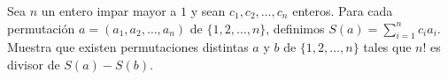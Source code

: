 Sea $n$ un entero impar mayor a $1$ y sean $c_1, c_2, \ldots, c_n$ enteros. Para cada permutación $a = (a_1, a_2, \ldots, a_n)$ de $\{1,2,\ldots,n\}$, definimos $S(a) = \sum_{i=1}^n c_i a_i$. Muestra que existen permutaciones distintas $a$ y $b$ de $\{1,2,\ldots,n\}$ tales que $n!$ es divisor de $S(a)-S(b)$.